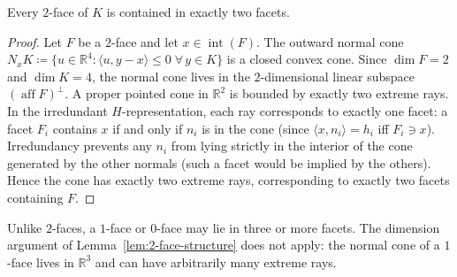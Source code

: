 \begin{lemma}\label{lem:2-face-structure}
Every $2$-face of $K$ is contained in exactly two facets.
\end{lemma}

\begin{proof}
Let $F$ be a $2$-face and let $x \in \operatorname{int}(F)$.
The outward normal cone
$N_x K \coloneqq \{ u \in \mathbb{R}^4 : \langle u, y - x \rangle \leq 0 \;\forall\, y \in K \}$
is a closed convex cone.
Since $\dim F = 2$ and $\dim K = 4$, the normal cone lives in the
$2$-dimensional linear subspace $(\operatorname{aff} F)^\perp$.
A proper pointed cone in $\mathbb{R}^2$ is bounded by
exactly two extreme rays.
In the irredundant $H$-representation,
each ray corresponds to exactly one facet:
a facet $F_i$ contains $x$ if and only if $n_i$ is in the cone
(since $\langle x, n_i \rangle = h_i$ iff $F_i \ni x$).
Irredundancy prevents any $n_i$ from lying strictly
in the interior of the cone generated by the other normals
(such a facet would be implied by the others).
Hence the cone has exactly two extreme rays,
corresponding to exactly two facets containing $F$.
\end{proof}

\begin{remark}\label{rem:lower-faces}
Unlike $2$-faces, a $1$-face or $0$-face may lie in three or more facets.
The dimension argument of Lemma~\ref{lem:2-face-structure}
does not apply: the normal cone of a $1$-face lives in $\mathbb{R}^3$
and can have arbitrarily many extreme rays.
\end{remark}

